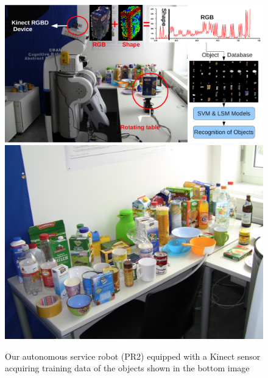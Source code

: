 \documentclass[conference]{sty/IEEEtran}
\begin{document}
\begin{figure}[htb!]
  \begin{center}
    \includegraphics[width=.99\columnwidth]{figures/firstpage/firstpage.pdf}
    \includegraphics[width=.99\columnwidth]{figures/objects/objects.jpg}
    \caption{Our autonomous service robot (PR2) equipped with a Kinect sensor
    acquiring training data of the objects shown in the bottom image}
    \label{fig:robot}
  \end{center}
\end{figure}

\end{document}
